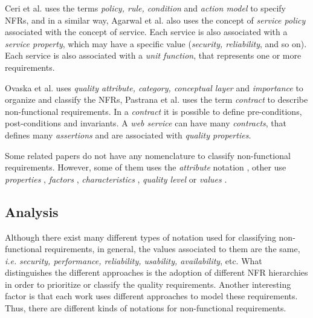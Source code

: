 Ceri et al.\cite{CeriDMF07} uses the terms \textit{policy, rule,
condition} and \textit{action model} to specify NFRs, and in a similar way,
Agarwal et al.\cite{AgarwalLS09} also uses the concept of \textit{service
policy} associated with the concept of service. Each service is also associated
with a \textit{service property}, which may have a specific value
(\textit{security, reliability}, and so on). Each service is also associated
with a \textit{unit function}, that represents one or more
requirements.

Ovaska et al.\cite{OvaskaEHPA10} uses
\textit{quality attribute, category, conceptual layer} and \textit{importance}
to organize and classify the NFRs, Pastrana et al.\cite{PastranaPK11} uses
the term \textit{contract} to describe non-functional requirements. In a
\textit{contract} it is possible to define pre-conditions, post-conditions and
invariants. A \textit{web service} can have many \textit{contracts}, that
defines many \textit{assertions} and are associated with \textit{quality
properties}. 




Some related papers do not have any
nomenclature to classify non-functional requirements. However, some of them uses
the \textit{attribute} notation \cite{ZhangPSP05,BasinDL06,JeongCL09}, other
use \textit{properties} \cite{Fabra2011}, \textit{factors}
\cite{MohantyRP10,GutierrezRF10}, \textit{characteristics}
\cite{DiamadopoulouMPS08}, \textit{quality level} \cite{ModicaTV09} or
\textit{values} \cite{ThissenW06,BasinDL06}.



\subsection{Analysis}
\label{sec:proposal}


Although there exist many different types of notation used for classifying
non-functional requirements, in general, the values associated to them are the
same, \textit{i.e.} \textit{security, performance, reliability, usability, availability}, etc. What
distinguishes the different approaches is the adoption of different NFR
hierarchies in order to prioritize or classify the quality requirements. Another interesting factor
is that each work uses different approaches to model these requirements.
Thus, there are different kinds of notations for non-functional
requirements.
 
